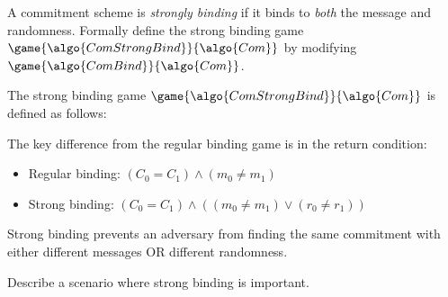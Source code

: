 \begin{exercise}
  A commitment scheme is \emph{strongly binding} if it binds to \emph{both} the message and randomness.
  Formally define the strong binding game $\game{\algo{ComStrongBind}}{\algo{Com}}$ by modifying $\game{\algo{ComBind}}{\algo{Com}}$.
\end{exercise}

\ifsolutions
\begin{mysolution}
  The strong binding game $\game{\algo{ComStrongBind}}{\algo{Com}}$ is defined as follows:
  
  \begin{center}
    \begin{tcolorbox}[width=8cm]
      \begin{pchstack}[center]
      \end{pchstack}
    \end{tcolorbox}
  \end{center}
  
  The key difference from the regular binding game is in the return condition:
  \begin{itemize}
    \item Regular binding: $(C_0 = C_1) \wedge (m_0 \neq m_1)$
    \item Strong binding: $(C_0 = C_1) \wedge ((m_0 \neq m_1) \vee (r_0 \neq r_1))$
  \end{itemize}
  
  Strong binding prevents an adversary from finding the same commitment with either different messages OR different randomness.
\end{mysolution}
\fi

\begin{exercise}[Optional]
  Describe a scenario where strong binding is important.
\end{exercise}

